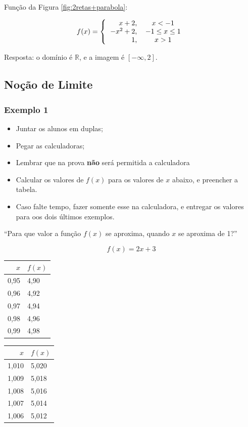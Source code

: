 \documentclass[a4paper]{article}
\begin{document}
Função da Figura \ref{fig:2retas+parabola}:

\begin{displaymath}
  f(x) =
  \left\{\begin{tabular}[h]{rc}
           $x+2$, & $x < -1$ \\
           $-x^2+2$, & $-1 \le x \le 1$ \\
           $1$, & $x > 1$\\ 
  \end{tabular}\right.
\end{displaymath}

Resposta: o domínio é $\mathbb{R}$, e a imagem é $[-\infty, 2]$.

\subsection{Noção de Limite}

\subsubsection{Exemplo 1}

\begin{itemize}
\item Juntar os alunos em duplas;
\item Pegar as calculadoras;
\item Lembrar que na prova {\bf não} será permitida a calculadora
\item Calcular os valores de $f(x)$ para os valores de $x$ abaixo, e preencher a tabela.
\item Caso falte tempo, fazer somente esse na calculadora, e entregar os valores para oos dois últimos exemplos.
\end{itemize}

``Para que valor a função $f(x)$ se aproxima, quando $x$ se aproxima de 1?''

\begin{displaymath}
  f(x) = 2x+3
\end{displaymath}

\begin{multicols}{2}
\begin{tabular}[h]{r|l}
  $x$ & $f(x)$\\
  \hline
0,95 & 4,90 \\
  \hline
0,96 & 4,92\\
  \hline
0,97 & 4,94\\
  \hline
0,98 & 4,96\\
  \hline
0,99 & 4,98\\
\end{tabular}


\begin{tabular}[h]{r|l}
  $x$ & $f(x)$\\
  \hline
1,010 & 5,020\\
  \hline
1,009 & 5,018\\
  \hline
1,008 & 5,016\\
  \hline
1,007 & 5,014\\
  \hline
1,006 & 5,012\\
\end{tabular}

\end{multicols}
\end{document}
